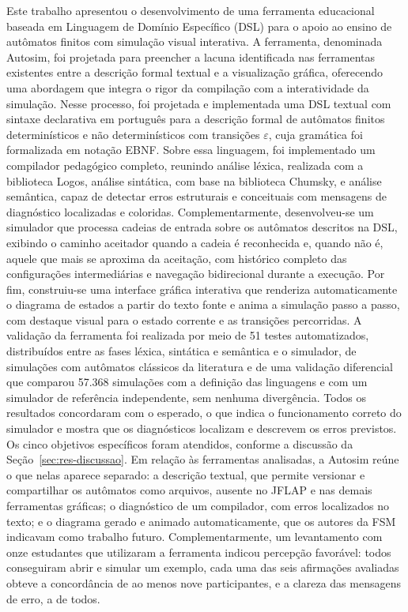 \documentclass[
    12pt
    ,oneside
    ,a4paper
    ,chapter=TITLE
    ,section=TITLE
    ,sumario=abnt-6027-2012]{abntex2}
\begin{document}
Este trabalho apresentou o desenvolvimento de uma ferramenta educacional baseada em
Linguagem de Domínio Específico (DSL) para o apoio ao ensino de autômatos finitos com
simulação visual interativa. A ferramenta, denominada Autosim, foi projetada para
preencher a lacuna identificada nas ferramentas existentes entre a descrição formal
textual e a visualização gráfica, oferecendo uma abordagem que integra o rigor da
compilação com a interatividade da simulação. Nesse processo, foi projetada e
implementada uma DSL textual com sintaxe declarativa em português para a descrição
formal de autômatos finitos determinísticos e não determinísticos com transições
$\varepsilon$, cuja gramática foi formalizada em notação EBNF. Sobre essa linguagem,
foi implementado um compilador pedagógico completo, reunindo análise léxica,
realizada com a biblioteca Logos, análise sintática, com base na biblioteca Chumsky,
e análise semântica, capaz de detectar erros estruturais e conceituais com mensagens
de diagnóstico localizadas e coloridas. Complementarmente, desenvolveu-se um
simulador que processa cadeias de entrada sobre os autômatos descritos na DSL,
exibindo o caminho aceitador quando a cadeia é reconhecida e, quando não é, aquele
que mais se aproxima da aceitação, com histórico completo das configurações
intermediárias e navegação bidirecional durante a execução. Por fim, construiu-se uma interface
gráfica interativa que renderiza automaticamente o diagrama de estados a partir do
texto fonte e anima a simulação passo a passo, com destaque visual para o estado
corrente e as transições percorridas. A validação da ferramenta foi realizada por meio
de 51 testes automatizados, distribuídos entre as fases léxica, sintática e
semântica e o simulador, de simulações com autômatos clássicos da literatura e de uma
validação diferencial que comparou 57.368 simulações com a definição das linguagens e com um
simulador de referência independente, sem nenhuma divergência. Todos os resultados
concordaram com o esperado, o que indica o funcionamento correto do simulador e mostra que os
diagnósticos localizam e descrevem os erros previstos. Os cinco objetivos específicos foram
atendidos, conforme a discussão da Seção~\ref{sec:res-discussao}. Em relação às ferramentas
analisadas, a Autosim reúne o que nelas aparece separado: a descrição textual, que permite
versionar e compartilhar os autômatos como arquivos, ausente no JFLAP e nas demais ferramentas
gráficas; o diagnóstico de um compilador, com erros localizados no texto; e o diagrama gerado
e animado automaticamente, que os autores da FSM indicavam como trabalho futuro.
Complementarmente, um levantamento com onze estudantes que utilizaram a ferramenta indicou percepção favorável: todos conseguiram
abrir e simular um exemplo, cada uma das seis afirmações avaliadas obteve a concordância de
ao menos nove participantes, e a clareza das mensagens de erro, a de todos.
\end{document}

